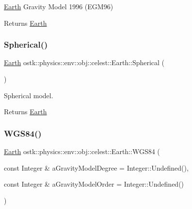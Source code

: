 \hyperlink{classostk_1_1physics_1_1env_1_1obj_1_1celest_1_1_earth}{Earth} Gravity Model 1996 (E\+G\+M96) 

\begin{DoxyReturn}{Returns}
\hyperlink{classostk_1_1physics_1_1env_1_1obj_1_1celest_1_1_earth}{Earth} 
\end{DoxyReturn}
\mbox{\label{classostk_1_1physics_1_1env_1_1obj_1_1celest_1_1_earth_ad0acee4f4eba8b80c7ed962ca86773fa}} 
\subsubsection{\texorpdfstring{Spherical()}{Spherical()}}
{\footnotesize\ttfamily \hyperlink{classostk_1_1physics_1_1env_1_1obj_1_1celest_1_1_earth}{Earth} ostk\+::physics\+::env\+::obj\+::celest\+::\+Earth\+::\+Spherical (\begin{DoxyParamCaption}{ }\end{DoxyParamCaption})\hspace{0.3cm}{\ttfamily [static]}}



Spherical model. 

\begin{DoxyReturn}{Returns}
\hyperlink{classostk_1_1physics_1_1env_1_1obj_1_1celest_1_1_earth}{Earth} 
\end{DoxyReturn}
\mbox{\label{classostk_1_1physics_1_1env_1_1obj_1_1celest_1_1_earth_a463005e1807fa7d6baec9cc677dd69e1}} 
\subsubsection{\texorpdfstring{W\+G\+S84()}{WGS84()}}
{\footnotesize\ttfamily \hyperlink{classostk_1_1physics_1_1env_1_1obj_1_1celest_1_1_earth}{Earth} ostk\+::physics\+::env\+::obj\+::celest\+::\+Earth\+::\+W\+G\+S84 (\begin{DoxyParamCaption}\item[{const Integer \&}]{a\+Gravity\+Model\+Degree = {\ttfamily Integer\+:\+:Undefined()},  }\item[{const Integer \&}]{a\+Gravity\+Model\+Order = {\ttfamily Integer\+:\+:Undefined()} }\end{DoxyParamCaption})\hspace{0.3cm}{\ttfamily [static]}}



